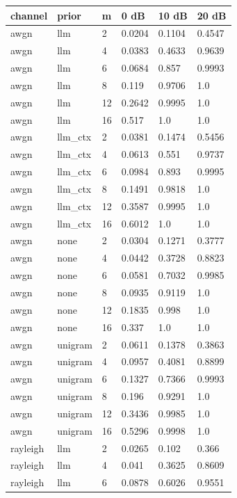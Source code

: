 \begin{tabular}{llllll}
\hline
channel & prior & m & 0 dB & 10 dB & 20 dB \\
\hline
awgn & llm & 2 & 0.0204 & 0.1104 & 0.4547 \\
awgn & llm & 4 & 0.0383 & 0.4633 & 0.9639 \\
awgn & llm & 6 & 0.0684 & 0.857 & 0.9993 \\
awgn & llm & 8 & 0.119 & 0.9706 & 1.0 \\
awgn & llm & 12 & 0.2642 & 0.9995 & 1.0 \\
awgn & llm & 16 & 0.517 & 1.0 & 1.0 \\
awgn & llm\_ctx & 2 & 0.0381 & 0.1474 & 0.5456 \\
awgn & llm\_ctx & 4 & 0.0613 & 0.551 & 0.9737 \\
awgn & llm\_ctx & 6 & 0.0984 & 0.893 & 0.9995 \\
awgn & llm\_ctx & 8 & 0.1491 & 0.9818 & 1.0 \\
awgn & llm\_ctx & 12 & 0.3587 & 0.9995 & 1.0 \\
awgn & llm\_ctx & 16 & 0.6012 & 1.0 & 1.0 \\
awgn & none & 2 & 0.0304 & 0.1271 & 0.3777 \\
awgn & none & 4 & 0.0442 & 0.3728 & 0.8823 \\
awgn & none & 6 & 0.0581 & 0.7032 & 0.9985 \\
awgn & none & 8 & 0.0935 & 0.9119 & 1.0 \\
awgn & none & 12 & 0.1835 & 0.998 & 1.0 \\
awgn & none & 16 & 0.337 & 1.0 & 1.0 \\
awgn & unigram & 2 & 0.0611 & 0.1378 & 0.3863 \\
awgn & unigram & 4 & 0.0957 & 0.4081 & 0.8899 \\
awgn & unigram & 6 & 0.1327 & 0.7366 & 0.9993 \\
awgn & unigram & 8 & 0.196 & 0.9291 & 1.0 \\
awgn & unigram & 12 & 0.3436 & 0.9985 & 1.0 \\
awgn & unigram & 16 & 0.5296 & 0.9998 & 1.0 \\
rayleigh & llm & 2 & 0.0265 & 0.102 & 0.366 \\
rayleigh & llm & 4 & 0.041 & 0.3625 & 0.8609 \\
rayleigh & llm & 6 & 0.0878 & 0.6026 & 0.9551 \\

\end{tabular}
